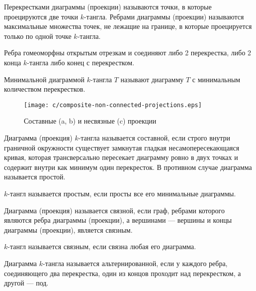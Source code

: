 	\begin{definition}
		Перекрестками диаграммы (проекции) называются точки, в которые проецируются две точки $k$-тангла. Ребрами
		диаграммы (проекции) называются максимальные множества точек, не лежащие на границе, в которые проецируется
		только по одной точке $k$-тангла.
	\end{definition}

	Ребра гомеоморфны открытым отрезкам и соединяют либо 2 перекрестка, либо 2 конца $k$-тангла либо конец с перекрестком.

	\begin{definition}
		Минимальной диаграммой $k$-тангла $T$ называют диаграмму $T$ с минимальным количеством перекрестков.
	\end{definition}

	\begin{figure}[ht]
		\centering
		\texttt{[image: c/composite-non-connected-projections.eps]}
		\caption{Составные (a, b) и несвязные (c) проекции\label{figure:composite-proj}}
	\end{figure}

	\begin{definition}
		Диаграмма (проекция) $k$-тангла называется составной, если строго внутри граничной окружности существует замкнутая
		гладкая несамопересекающаяся кривая, которая трансверсально пересекает диаграмму ровно в двух точках и содержит
		внутри как минимум один перекресток. В противном случае диаграмма называется простой.
	\end{definition}

	\begin{definition}
		$k$-тангл называется простым, если просты все его минимальные диаграммы.
	\end{definition}

	\begin{definition}
		Диаграмма (проекция) называется связной, если граф, ребрами которого являются ребра диаграммы (проекции), а
		вершинами --- вершины и концы диаграммы (проекции), является связным.
	\end{definition}

	\begin{definition}
		$k$-тангл называется связным, если связна любая его диаграмма.
	\end{definition}

	\begin{definition}
		Диаграмма $k$-тангла называется альтернированной, если у каждого ребра, соединяющего два перекрестка, один из
		концов проходит над перекрестком, а другой --- под.
	\end{definition}

